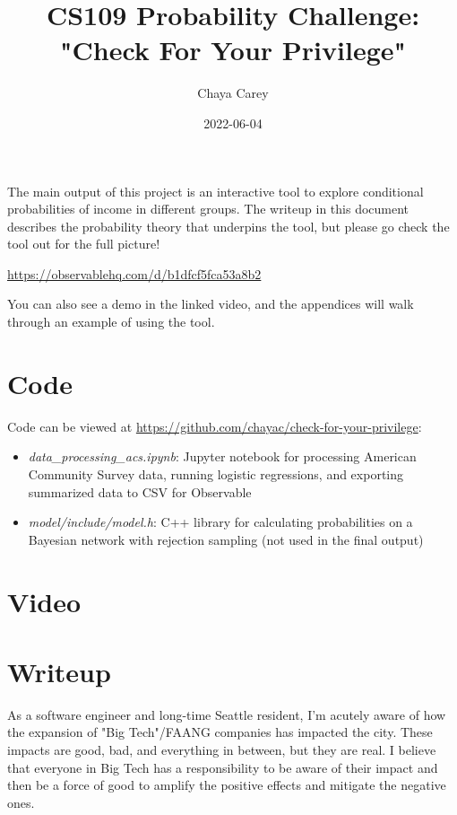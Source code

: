 \documentclass[12pt]{article}
\title{CS109 Probability Challenge: "Check For Your Privilege"}
\author{Chaya Carey}
\date{2022-06-04}
\begin{document}



The main output of this project is an interactive tool to explore conditional probabilities of income in different groups. The writeup in this document describes the probability theory that underpins the tool, but please go check the tool out for the full picture!

\href{https://observablehq.com/d/b1dfcf5fca53a8b2}{https://observablehq.com/d/b1dfcf5fca53a8b2}

You can also see a demo in the linked video, and the appendices will walk through an example of using the tool.

\section{Code}
Code can be viewed at \href{https://github.com/chayac/check-for-your-privilege}{https://github.com/chayac/check-for-your-privilege}:
\begin{itemize}
    \item \textit{data\_processing\_acs.ipynb}: Jupyter notebook for processing American Community Survey data, running logistic regressions, and exporting summarized data to CSV for Observable
    \item \textit{model/include/model.h}: C++ library for calculating probabilities on a Bayesian network with rejection sampling (not used in the final output)
\end{itemize}

\section{Video}

\newpage

\section{Writeup}

As a software engineer and long-time Seattle resident, I'm acutely aware of how the expansion of "Big Tech"/FAANG companies has impacted the city. These impacts are good, bad, and everything in between, but they are real. I believe that everyone in Big Tech has a responsibility to be aware of their impact and then be a force of good to amplify the positive effects and mitigate the negative ones.
\end{document}
